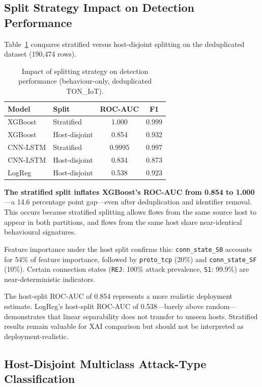 \documentclass[12pt,a4paper]{report}
\begin{document}
\subsection{Split Strategy Impact on Detection Performance}
\label{sec:split-impact}

Table~\ref{tab:split-impact} compares stratified versus host-disjoint splitting on the deduplicated dataset (190,474 rows).

\begin{table}[H]
\centering
\caption{Impact of splitting strategy on detection performance (behaviour-only, deduplicated TON\_IoT).}
\label{tab:split-impact}
\begin{tabular}{llcc}
\toprule
\textbf{Model} & \textbf{Split} & \textbf{ROC-AUC} & \textbf{F1} \\
\midrule
XGBoost & Stratified & 1.000 & 0.999 \\
XGBoost & Host-disjoint & 0.854 & 0.932 \\
CNN-LSTM & Stratified & 0.9995 & 0.997 \\
CNN-LSTM & Host-disjoint & 0.834 & 0.873 \\
LogReg & Host-disjoint & 0.538 & 0.923 \\
\bottomrule
\end{tabular}
\end{table}

\textbf{The stratified split inflates XGBoost's ROC-AUC from 0.854 to 1.000}---a 14.6 percentage point gap---even after deduplication and identifier removal. This occurs because stratified splitting allows flows from the same source host to appear in both partitions, and flows from the same host share near-identical behavioural signatures.

Feature importance under the host split confirms this: \texttt{conn\_state\_S0} accounts for 54\% of feature importance, followed by \texttt{proto\_tcp} (20\%) and \texttt{conn\_state\_SF} (10\%). Certain connection states (\texttt{REJ}: 100\% attack prevalence, \texttt{S1}: 99.9\%) are near-deterministic indicators.

The host-split ROC-AUC of 0.854 represents a more realistic deployment estimate. LogReg's host-split ROC-AUC of 0.538---barely above random---demonstrates that linear separability does not transfer to unseen hosts. Stratified results remain valuable for XAI comparison but should not be interpreted as deployment-realistic.

\subsection{Host-Disjoint Multiclass Attack-Type Classification}
\label{sec:host-multiclass}
\end{document}
